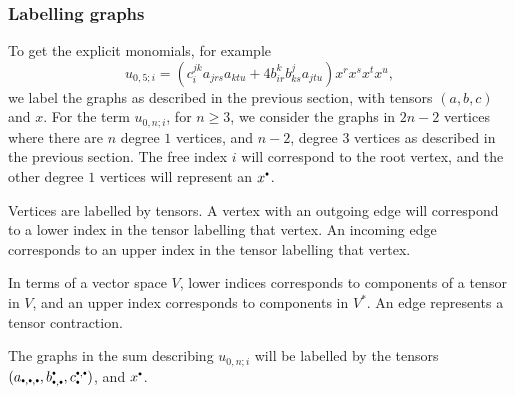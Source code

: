     
    


    \subsubsection{Labelling graphs}
    
    To get the explicit monomials, for example \[ u_{0,5;i} = \left( c_i^{jk} a_{j r s } a_{k t u } + 4 b_{ir}^{k} b_{ks}^j a_{jtu} \right) x^r x^s x^t x^u, \]
    we label the graphs as described in the previous section, with tensors \( (a,b,c)\) and \(x\). For the term \( u_{0,n;i}\), for \( n \geq 3\), we consider the graphs in \(2n-2\) vertices where there are \(n\) degree \(1\) vertices, and \(n-2\), degree \(3\) vertices as described in the previous section. The free index \(i\) will correspond to the root vertex, and the other degree \(1\) vertices will represent an \(x^{\sbt}\).
    
    Vertices are labelled by tensors. A vertex with an outgoing edge will correspond to a lower index in the tensor labelling that vertex. An incoming edge corresponds to an upper index in the tensor labelling that vertex. 
    
    In terms of a vector space \(V\), lower indices corresponds to components of a tensor in \(V\), and an upper index corresponds to components in \(V^* \). An edge represents a tensor contraction.
    
    The graphs in the sum describing \( u_{0,n;i}\) will be labelled by the tensors \( (a_{\sbt,\sbt,\sbt},b_{\sbt,\sbt}^{\sbt}, c_{\sbt}^{\sbt,\sbt})\), and \(x^{\sbt}\).

